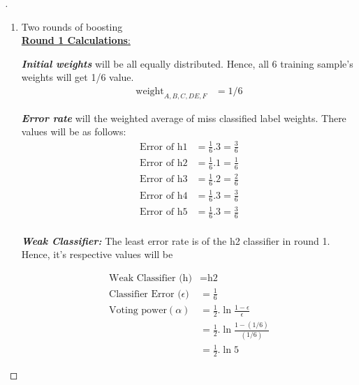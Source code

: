 \documentclass[a4paper, 12pt]{article}
\begin{document}
\begin{proof}[]

\hfill

\begin{enumerate}[label={\color{blue}{\textbf{3.\arabic*})}}]
    \item 
        Two rounds of boosting \\
        
        \underline{\textbf{Round 1 Calculations}:}
        
        
        \textit{\textbf{Initial weights}} will be all equally distributed. Hence, all 6 training sample's weights will get 1/6 value.
        \begin{align*}
            \text{weight}_{A, B, C, D E, F}  &= 1/6
        \end{align*}
        
        \textit{\textbf{Error rate}} will the weighted average of miss classified label weights. There values will be as follows:
        \begin{align*}
            \text{Error of h1} &= \frac{1}{6}.3 = \frac{3}{6}\\
            \text{Error of h2} &= \frac{1}{6}.1 = \frac{1}{6}\\
            \text{Error of h3} &= \frac{1}{6}.2 = \frac{2}{6}\\
            \text{Error of h4} &= \frac{1}{6}.3 = \frac{3}{6}\\
            \text{Error of h5} &= \frac{1}{6}.3 = \frac{3}{6}\\
        \end{align*}
        
        
        \textit{\textbf{Weak Classifier:}} The least error rate is of the h2 classifier in round 1. Hence, it's respective values will be 
        
        \begin{align*}
            \text{Weak Classifier (h)} &= \text{h2}\\
            \text{Classifier Error ($\epsilon $)} &=  \frac{1}{6}  \\
            \text{Voting power} (\alpha)  &= \frac{1}{2}.\ln{\frac{1 - \epsilon}{\epsilon}} \\  
                    &= \frac{1}{2}.\ln{\frac{1 - (1/6)}{(1/6)}} \\ 
                    &= \frac{1}{2}.\ln{5}  
        \end{align*}
        

\end{enumerate}
\end{proof}
\end{document}
